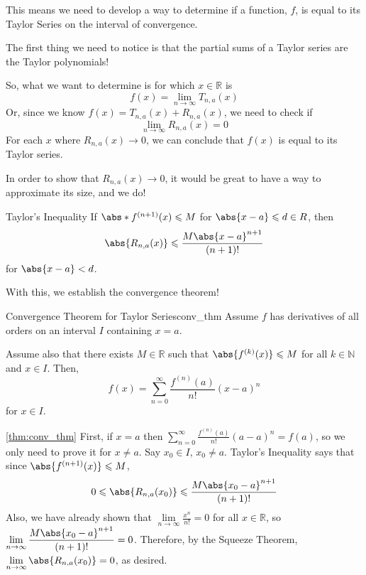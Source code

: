 This means we need to develop a way to determine if a function, $ f $,
is equal to its Taylor Series on the interval of convergence.

The first thing we need to notice is that the partial sums of a
Taylor series are the Taylor polynomials!

So, what we want to determine is for which $ x\in\mathbb{R} $ is
\[ f(x)=\lim\limits_{{n} \to {\infty}} T_{n,a}(x) \]
Or, since we know $ f(x)=T_{n,a}(x) + R_{n,a}(x) $,
we need to check if
\[ \lim\limits_{{n} \to {\infty}} R_{n,a}(x)=0 \]
For each $ x $ where $ R_{n,a}(x)\to 0 $, we can conclude that
$ f(x) $ is equal to its Taylor series.

In order to show that $ R_{n,a}(x)\to 0 $, it would be
great to have a way to approximate
its size, and we do!

\begin{Theorem}{Taylor's Inequality}{}
    If $ \abs*{f^{(n+1)}(x)}\leqslant M $ for $ \abs{x-a}\leqslant d\in\mathbb{R} $,
    then
    \[ \abs{R_{n,a}(x)}\leqslant \frac{M\abs{x-a}^{n+1}}{(n+1)!}  \]
    for $ \abs{x-a}<d $.
\end{Theorem}
With this, we establish the convergence theorem!
\begin{Theorem}{Convergence Theorem for Taylor Series}{conv_thm}
    Assume $ f $ has derivatives of all orders on an interval
    $ I $ containing $ x=a $.

    Assume also that there exists $ M\in\mathbb{R} $ such that
    $ \abs{f^{(k)}(x)}\leqslant M $ for all $ k\in\mathbb{N} $
    and $ x\in I $. Then,
    \[ f(x)=\sum\limits_{n=0}^{\infty} \frac{f^{(n)}(a)}{n!}(x-a)^n \]
    for $ x\in I $.
\end{Theorem}

\begin{Proof}{\ref{thm:conv_thm}}{}
    First, if $ x=a $ then $ \displaystyle \sum\limits_{n=0}^{\infty} \frac{f^{(n)}(a)}{n!}(a-a)^n
        =f(a) $, so we only need to prove it for $ x\neq a $. Say $ x_0\in I $,
    $ x_0\neq a $. Taylor's Inequality says that since $ \abs{f^{(n+1)}(x)}\leqslant M $,
    \[ 0\leqslant \abs{R_{n,a}(x_0)}\leqslant
        \frac{M\abs{x_0-a}^{n+1}}{(n+1)!} \]
    Also, we have already shown that $ \displaystyle\lim\limits_{{n} \to {\infty}}\frac{x^n}{n!} =0 $
    for all $ x\in\mathbb{R} $, so $ \displaystyle\lim\limits_{{n} \to {\infty}}
        \frac{M\abs{x_0-a}^{n+1}}{(n+1)!} =0 $. Therefore, by the Squeeze Theorem,
    $ \lim\limits_{{n} \to {\infty}} \abs{R_{n,a}(x_0)}=0 $, as desired.
\end{Proof}


